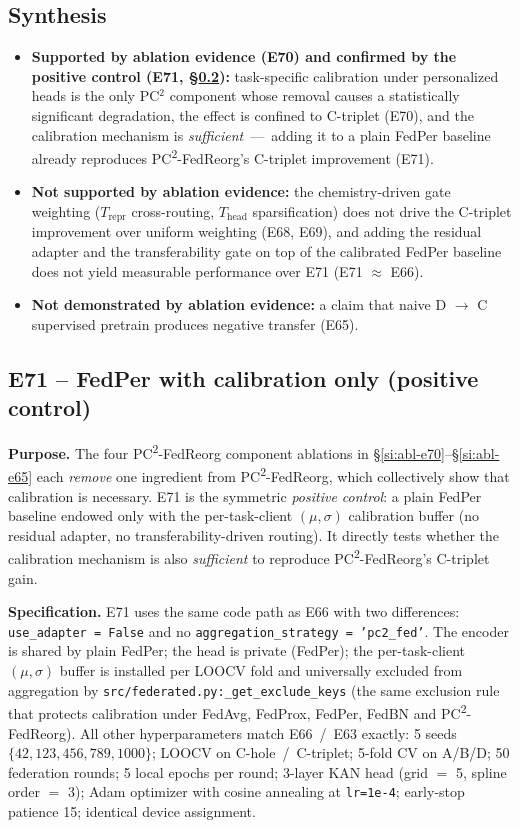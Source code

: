 \documentclass[11pt,a4paper]{article}
\newcommand{\PC}{PC\textsuperscript{2}-FedReorg}
\begin{document}
\subsection{Synthesis}
\begin{itemize}
  \item \textbf{Supported by ablation evidence (E70) and confirmed by the positive control (E71, \S\ref{si:abl-e71}):} task-specific calibration under personalized heads is the only PC$^2$ component whose removal causes a statistically significant degradation, the effect is confined to C-triplet (E70), and the calibration mechanism is \emph{sufficient}~---~adding it to a plain FedPer baseline already reproduces \PC{}'s C-triplet improvement (E71).
  \item \textbf{Not supported by ablation evidence:} the chemistry-driven gate weighting (\texorpdfstring{$T_{\mathrm{repr}}$}{T\_repr} cross-routing, \texorpdfstring{$T_{\mathrm{head}}$}{T\_head} sparsification) does not drive the C-triplet improvement over uniform weighting (E68, E69), and adding the residual adapter and the transferability gate on top of the calibrated FedPer baseline does not yield measurable performance over E71 (E71 $\approx$ E66).
  \item \textbf{Not demonstrated by ablation evidence:} a claim that naive D $\to$ C supervised pretrain produces negative transfer (E65).
\end{itemize}

\subsection{E71 -- FedPer with calibration only (positive control)}\label{si:abl-e71}

\textbf{Purpose.} The four \PC{} component ablations in \S\ref{si:abl-e70}--\S\ref{si:abl-e65} each \emph{remove} one ingredient from \PC{}, which collectively show that calibration is necessary. E71 is the symmetric \emph{positive control}: a plain FedPer baseline endowed only with the per-task-client $(\mu, \sigma)$ calibration buffer (no residual adapter, no transferability-driven routing). It directly tests whether the calibration mechanism is also \emph{sufficient} to reproduce \PC{}'s C-triplet gain.

\textbf{Specification.} E71 uses the same code path as E66 with two differences: \texttt{use\_adapter = False} and no \texttt{aggregation\_strategy = 'pc2\_fed'}. The encoder is shared by plain FedPer; the head is private (FedPer); the per-task-client $(\mu, \sigma)$ buffer is installed per LOOCV fold and universally excluded from aggregation by \texttt{src/federated.py:\_get\_exclude\_keys} (the same exclusion rule that protects calibration under FedAvg, FedProx, FedPer, FedBN and \PC{}). All other hyperparameters match E66~/~E63 exactly: 5 seeds $\{42, 123, 456, 789, 1000\}$; LOOCV on C-hole~/~C-triplet; 5-fold CV on A/B/D; 50 federation rounds; 5 local epochs per round; 3-layer KAN head (grid $=$ 5, spline order $=$ 3); Adam optimizer with cosine annealing at \texttt{lr=1e-4}; early-stop patience 15; identical device assignment.
\end{document}
